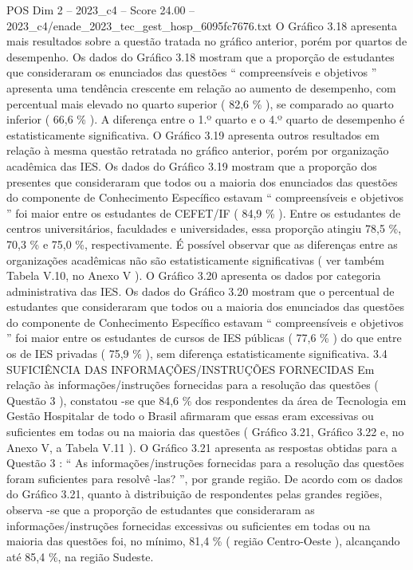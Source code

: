 \begin{textsample}{POS Dim 2 – 2023\_c4 – Score 24.00 – 2023\_c4/enade\_2023\_tec\_gest\_hosp\_6095fc7676.txt}
O Gráfico 3.18 apresenta mais resultados sobre a questão tratada no gráfico anterior, porém por quartos de desempenho.
Os dados do Gráfico 3.18 mostram que a proporção de estudantes que consideraram os enunciados das questões “ compreensíveis e objetivos ” apresenta uma tendência crescente em relação ao aumento de desempenho, com percentual mais elevado no quarto superior ( 82,6 \% ), se comparado ao quarto inferior ( 66,6 \% ).
A diferença entre o 1.º quarto e o 4.º quarto de desempenho é estatisticamente significativa.
O Gráfico 3.19 apresenta outros resultados em relação à mesma questão retratada no gráfico anterior, porém por organização acadêmica das IES.
Os dados do Gráfico 3.19 mostram que a proporção dos presentes que consideraram que todos ou a maioria dos enunciados das questões do componente de Conhecimento Específico estavam “ compreensíveis e objetivos ” foi maior entre os estudantes de CEFET/IF ( 84,9 \% ).
Entre os estudantes de centros universitários, faculdades e universidades, essa proporção atingiu 78,5 \%, 70,3 \% e 75,0 \%, respectivamente.
É possível observar que as diferenças entre as organizações acadêmicas não são estatisticamente significativas ( ver também Tabela V.10, no Anexo V ).
O Gráfico 3.20 apresenta os dados por categoria administrativa das IES.
Os dados do Gráfico 3.20 mostram que o percentual de estudantes que consideraram que todos ou a maioria dos enunciados das questões do componente de Conhecimento Específico estavam “ compreensíveis e objetivos ” foi maior entre os estudantes de cursos de IES públicas ( 77,6 \% ) do que entre os de IES privadas ( 75,9 \% ), sem diferença estatisticamente significativa. 3.4 SUFICIÊNCIA DAS INFORMAÇÕES/INSTRUÇÕES FORNECIDAS Em relação às informações/instruções fornecidas para a resolução das questões ( Questão 3 ), constatou -se que 84,6 \% dos respondentes da área de Tecnologia em Gestão Hospitalar de todo o Brasil afirmaram que essas eram excessivas ou suficientes em todas ou na maioria das questões ( Gráfico 3.21, Gráfico 3.22 e, no Anexo V, a Tabela V.11 ).
O Gráfico 3.21 apresenta as respostas obtidas para a Questão 3 : “ As informações/instruções fornecidas para a resolução das questões foram suficientes para resolvê -las? ”, por grande região.
De acordo com os dados do Gráfico 3.21, quanto à distribuição de respondentes pelas grandes regiões, observa -se que a proporção de estudantes que consideraram as informações/instruções fornecidas excessivas ou suficientes em todas ou na maioria das questões foi, no mínimo, 81,4 \% ( região Centro-Oeste ), alcançando até 85,4 \%, na região Sudeste.

\end{textsample}
